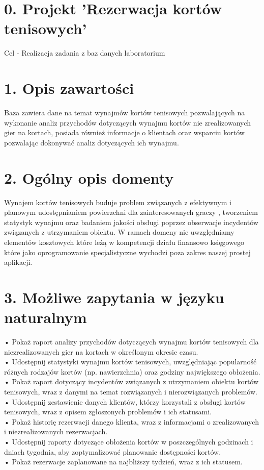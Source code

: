 \documentclass{article}
\begin{document}
\section*{0. Projekt 'Rezerwacja kortów tenisowych'}
Cel - Realizacja zadania z baz danych  laboratorium 

\section*{1. Opis zawartości}

Baza zawiera dane na temat wynajmów kortów tenisowych pozwalających na wykonanie analiz przychodów dotyczących wynajmu kortów nie zrealizowanych gier na kortach, posiada również informacje o klientach oraz wsparciu kortów pozwalając dokonywać analiz dotyczących ich wynajmu.


\section*{2. Ogólny opis domenty}

Wynajem kortów tenisowych buduje problem  związanych z efektywnym i planowym udostępnianiem powierzchni dla zainteresowanych graczy , tworzeniem statystyk wynajmu oraz badaniem jakości obsługi poprzez obserwacje incydentów związanych z utrzymaniem obiektu.
W ramach domeny nie uwzględniamy elementów kosztowych  które leżą w kompetencji działu finansowo księgowego które jako oprogramowanie specjalistyczne  wychodzi poza zakres naszej prostej aplikacji.


\section*{3. Możliwe zapytania w języku naturalnym}

\noindent

•	Pokaż raport analizy przychodów dotyczących wynajmu kortów tenisowych dla niezrealizowanych gier na kortach w określonym okresie czasu.\\
•	Udostępnij statystyki wynajmu kortów tenisowych, uwzględniając popularność różnych rodzajów kortów (np. nawierzchnia) oraz godziny największego obłożenia.\\
•	Pokaż raport dotyczący incydentów związanych z utrzymaniem obiektu kortów tenisowych, wraz z danymi na temat rozwiązanych i nierozwiązanych problemów.\\
•	Udostępnij zestawienie danych klientów, którzy korzystali z obsługi kortów tenisowych, wraz z opisem zgłoszonych problemów i ich statusami.\\
•	Pokaż historię rezerwacji danego klienta, wraz z informacjami o zrealizowanych i niezrealizowanych rezerwacjach.\\
•	Udostępnij raporty dotyczące obłożenia kortów w poszczególnych godzinach i dniach tygodnia, aby zoptymalizować planowanie dostępności kortów.\\
•	Pokaż rezerwacje zaplanowane na najbliższy tydzień, wraz z ich statusem.
\end{document}
